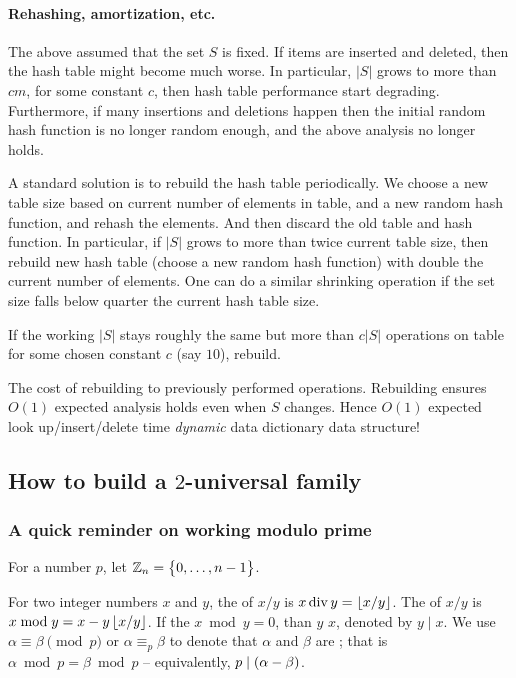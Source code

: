 \paragraph*{Rehashing, amortization, etc. }
The above assumed that the set $S$ is fixed.  If items are inserted
and deleted, then the hash table might become much worse.  In
particular, $|S|$ grows to more than $cm$, for some constant $c$, then
hash table performance start degrading.  Furthermore, if many
insertions and deletions happen then the initial random hash function
is no longer random enough, and the above analysis no longer holds.

A standard solution is to rebuild the hash table periodically.  We
choose a new table size based on current number of elements in table,
and a new random hash function, and rehash the elements. And then
discard the old table and hash function.  In particular, if $|S|$
grows to more than twice current table size, then rebuild new hash
table (choose a new random hash function) with double the current
number of elements. One can do a similar shrinking operation if the
set size falls below quarter the current hash table size.
    
If the working $|S|$ stays roughly the same but more than $c|S|$
operations on table for some chosen constant $c$ (say $10$), rebuild.

The  cost of rebuilding to previously performed
operations. Rebuilding ensures $O(1)$ expected analysis holds even
when $S$ changes. Hence $O(1)$ expected look up/insert/delete time
{\em dynamic} data dictionary data structure!


\subsection{How to build a $2$-universal family}
\providecommand{\bdiv}{\mathop{\mathrm{div}}}%
\providecommand{\divides}{\mid}%

\subsubsection{A quick reminder on working modulo prime}

\begin{defn}
    For a number $p$, let $\mathbb{Z}_n = \left\{ {0, \ldots, n-1 \bigl. } \right\}$.
    
    For two integer numbers $x$ and $y$, the  of $x/y$
    is $x \bdiv y = \floor{x/y}$. The  of $x/y$ is
    $x \bmod y = x - y \left\lfloor {x/y} \right\rfloor$. If the $x \bmod y = 0$, than $y$
     $x$, denoted by $y \divides x$.  We use
    $\alpha \equiv \beta \pmod{p}$ or $\alpha \equiv_p \beta$ to
    denote that $\alpha$ and $\beta$ are ;
    that is $\alpha \bmod p = \beta \bmod p$ -- equivalently,
    $p \divides \pth[]{\alpha - \beta}$.
\end{defn}

